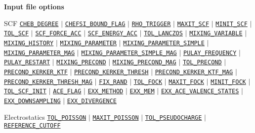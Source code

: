 \begin{frame}[allowframebreaks]{\textbf{Input file options}}
  \begin{block}{SCF}
  \hyperlink{CHEB_DEGREE}{\texttt{CHEB\_DEGREE}} $\vert$
  \hyperlink{CHEFSI_BOUND_FLAG}{\texttt{CHEFSI\_BOUND\_FLAG}} $\vert$
  \hyperlink{RHO_TRIGGER}{\texttt{RHO\_TRIGGER}} $\vert$
  \hyperlink{MAXIT_SCF}{\texttt{MAXIT\_SCF}} $\vert$
  \hyperlink{MINIT_SCF}{\texttt{MINIT\_SCF}} $\vert$
  \hyperlink{TOL_SCF}{\texttt{TOL\_SCF}} $\vert$
  \hyperlink{SCF_FORCE_ACC}{\texttt{SCF\_FORCE\_ACC}} $\vert$
  \hyperlink{SCF_ENERGY_ACC}{\texttt{SCF\_ENERGY\_ACC}} $\vert$
  \hyperlink{TOL_LANCZOS}{\texttt{TOL\_LANCZOS}} $\vert$
  \hyperlink{MIXING_VARIABLE}{\texttt{MIXING\_VARIABLE}} $\vert$
  \hyperlink{MIXING_HISTORY}{\texttt{MIXING\_HISTORY}} $\vert$
  \hyperlink{MIXING_PARAMETER}{\texttt{MIXING\_PARAMETER}} $\vert$
  \hyperlink{MIXING_PARAMETER_SIMPLE}{\texttt{MIXING\_PARAMETER\_SIMPLE}} $\vert$
  \hyperlink{MIXING_PARAMETER_MAG}{\texttt{MIXING\_PARAMETER\_MAG}} $\vert$
  \hyperlink{MIXING_PARAMETER_SIMPLE_MAG}{\texttt{MIXING\_PARAMETER\_SIMPLE\_MAG}} $\vert$
  \hyperlink{PULAY_FREQUENCY}{\texttt{PULAY\_FREQUENCY}} $\vert$
  \hyperlink{PULAY_RESTART}{\texttt{PULAY\_RESTART}} $\vert$
  \hyperlink{MIXING_PRECOND}{\texttt{MIXING\_PRECOND}} $\vert$
  \hyperlink{MIXING_PRECOND_MAG}{\texttt{MIXING\_PRECOND\_MAG}} $\vert$
  \hyperlink{TOL_PRECOND}{\texttt{TOL\_PRECOND}} $\vert$
  \hyperlink{PRECOND_KERKER_KTF}{\texttt{PRECOND\_KERKER\_KTF}} $\vert$
  \hyperlink{PRECOND_KERKER_THRESH}{\texttt{PRECOND\_KERKER\_THRESH}} $\vert$
  \hyperlink{PRECOND_KERKER_KTF_MAG}{\texttt{PRECOND\_KERKER\_KTF\_MAG}} $\vert$
  \hyperlink{PRECOND_KERKER_THRESH_MAG}{\texttt{PRECOND\_KERKER\_THRESH\_MAG}} $\vert$
  \hyperlink{FIX_RAND}{\texttt{FIX\_RAND}} $\vert$ 
  \hyperlink{TOL_FOCK}{\texttt{TOL\_FOCK}} $\vert$ 
  \hyperlink{MAXIT_FOCK}{\texttt{MAXIT\_FOCK}} $\vert$ 
  \hyperlink{MINIT_FOCK}{\texttt{MINIT\_FOCK}} $\vert$ 
  \hyperlink{TOL_SCF_INIT}{\texttt{TOL\_SCF\_INIT}} $\vert$ 
  \hyperlink{ACE_FLAG}{\texttt{ACE\_FLAG}} $\vert$ 
  \hyperlink{EXX_METHOD}{\texttt{EXX\_METHOD}} $\vert$ 
  \hyperlink{EXX_MEM}{\texttt{EXX\_MEM}} $\vert$ 
  \hyperlink{EXX_ACE_VALENCE_STATES}{\texttt{EXX\_ACE\_VALENCE\_STATES}} $\vert$ 
  \hyperlink{EXX_DOWNSAMPLING}{\texttt{EXX\_DOWNSAMPLING}} $\vert$ 
  \hyperlink{EXX_DIVERGENCE}{\texttt{EXX\_DIVERGENCE}}
  \end{block}
  
  \vspace{-2mm}
  \begin{block}{Electrostatics}
  \hyperlink{TOL_POISSON}{\texttt{TOL\_POISSON}} $\vert$
  \hyperlink{MAXIT_POISSON}{\texttt{MAXIT\_POISSON}} $\vert$
  \hyperlink{TOL_PSEUDOCHARGE}{\texttt{TOL\_PSEUDOCHARGE}} $\vert$
  \hyperlink{REFERENCE_CUTOFF}{\texttt{REFERENCE\_CUTOFF}} 
  \end{block}
  

\end{frame}
